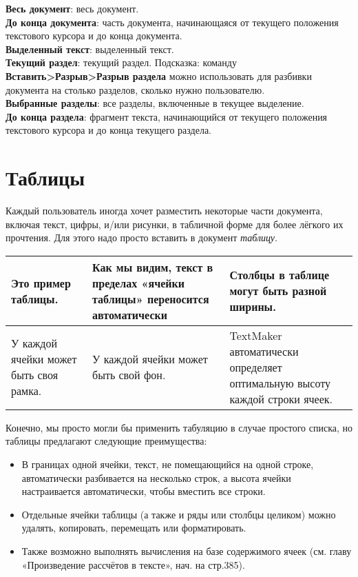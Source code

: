 \documentclass[a4paper,10pt]{article}
\begin{document}
\begin{itemize}
 \textbf{Весь документ}: весь документ.\\
 \textbf{До конца документа}: часть документа, начинающаяся от текущего положения текстового курсора и до конца документа.\\
 \textbf{Выделенный текст}: выделенный текст.\\
 \textbf{Текущий раздел}: текущий раздел. Подсказка: команду \textbf{Вставить>Разрыв>Разрыв раздела} можно использовать для разбивки документа на столько разделов, сколько нужно пользователю.\\
 \textbf{Выбранные разделы}: все разделы, включенные в текущее выделение.\\
 \textbf{До конца раздела}: фрагмент текста, начинающийся от текущего положения текстового курсора и до конца текущего раздела.
\end{itemize}


\section{Таблицы}
Каждый пользователь иногда хочет разместить некоторые части документа, включая текст, цифры, и/или рисунки, в табличной форме для более лёгкого их прочтения. Для этого надо просто вставить в документ \textit{таблицу}.

\begin{center}
\begin{tabular}{ | m{4cm} | m{7cm} | m{5cm} |}
\hline
 Это пример таблицы. & Как мы видим, текст в пределах «ячейки таблицы» переносится автоматически & Столбцы в таблице могут быть разной ширины.\\ 
 \hline
 У каждой ячейки может быть своя рамка. & У каждой ячейки может быть свой фон. & TextMaker автоматически определяет оптимальную высоту каждой строки ячеек.\\
\hline
\end{tabular}
\end{center}

Конечно, мы просто могли бы применить табуляцию в случае простого списка, но таблицы предлагают следующие преимущества:
\begin{itemize}
 \item В границах одной ячейки, текст, не помещающийся на одной строке, автоматически разбивается на несколько строк, а высота ячейки настраивается автоматически, чтобы вместить все строки.
 \item Отдельные ячейки таблицы (а также и ряды или столбцы целиком) можно удалять, копировать, перемещать или форматировать.
 \item Также возможно выполнять вычисления на базе содержимого ячеек (см. главу «Произведение рассчётов в тексте», нач. на стр.385).
\end{itemize}
\end{document}
